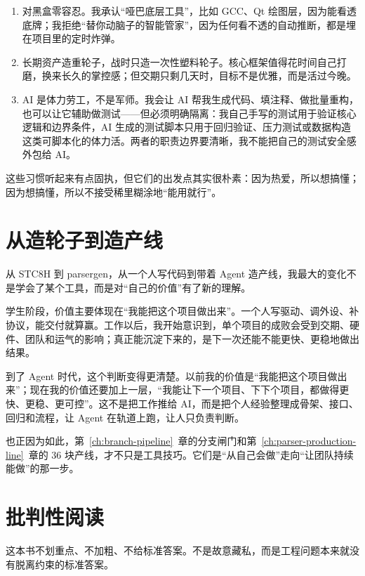 \begin{enumerate}
	\item 对黑盒零容忍。我承认“哑巴底层工具”，比如 GCC、Qt 绘图层，因为能看透底牌；我拒绝“替你动脑子的智能管家”，因为任何看不透的自动推断，都是埋在项目里的定时炸弹。
	\item 长期资产造重轮子，战时只造一次性塑料轮子。核心框架值得花时间自己打磨，换来长久的掌控感；但交期只剩几天时，目标不是优雅，而是活过今晚。
	\item AI 是体力劳工，不是军师。我会让 AI 帮我生成代码、填注释、做批量重构，也可以让它辅助做测试——但必须明确隔离：我自己手写的测试用于验证核心逻辑和边界条件，AI 生成的测试脚本只用于回归验证、压力测试或数据构造这类可脚本化的体力活。两者的职责边界要清晰，我不能把自己的测试安全感外包给 AI。
\end{enumerate}

这些习惯听起来有点固执，但它们的出发点其实很朴素：因为热爱，所以想搞懂；因为想搞懂，所以不接受稀里糊涂地“能用就行”。

\section{从造轮子到造产线}

从 STC8H 到 parsergen，从一个人写代码到带着 Agent 造产线，我最大的变化不是学会了某个工具，而是对“自己的价值”有了新的理解。

学生阶段，价值主要体现在“我能把这个项目做出来”。一个人写驱动、调外设、补协议，能交付就算赢。工作以后，我开始意识到，单个项目的成败会受到交期、硬件、团队和运气的影响；真正能沉淀下来的，是下一次还能不能更快、更稳地做出结果。

到了 Agent 时代，这个判断变得更清楚。以前我的价值是“我能把这个项目做出来”；现在我的价值还要加上一层，“我能让下一个项目、下下个项目，都做得更快、更稳、更可控”。这不是把工作推给 AI，而是把个人经验整理成骨架、接口、回归和流程，让 Agent 在轨道上跑，让人只负责判断。

也正因为如此，第~\ref{ch:branch-pipeline}~章的分支闸门和第~\ref{ch:parser-production-line}~章的 36 块产线，才不只是工具技巧。它们是“从自己会做”走向“让团队持续能做”的那一步。

\section{批判性阅读}

这本书不划重点、不加粗、不给标准答案。不是故意藏私，而是工程问题本来就没有脱离约束的标准答案。

